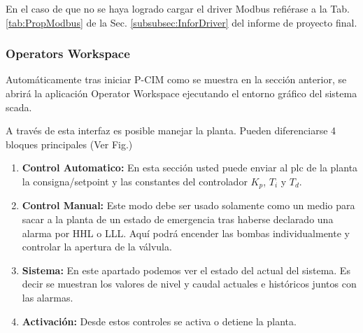 \begin{lattention}
En el caso de que no se haya logrado cargar el driver Modbus refiérase a la 
Tab. \ref{tab:PropModbus} de la Sec. \ref{subsubsec:InforDriver} del informe
de proyecto final.
\end{lattention}

\subsubsection{Operators Workspace}

Automáticamente tras iniciar P-CIM como se muestra en la sección anterior, se 
abrirá la aplicación Operator Workspace ejecutando el entorno gráfico del 
sistema \gls{scada}.

A través de esta interfaz es posible manejar la planta.
Pueden diferenciarse 4 bloques principales (Ver Fig.)
\begin{enumerate}
 \item \textbf{Control Automatico:} En esta sección usted puede enviar al
\gls{plc} de la planta la consigna/setpoint y las constantes del controlador
$K_p$, $T_i$ y $T_d$.
 \item \textbf{Control Manual:} Este modo debe ser usado solamente como un
medio para
sacar a la planta de un estado de emergencia tras  haberse declarado una alarma
por HHL o LLL.
Aquí podrá encender las bombas individualmente y controlar la apertura de la
válvula.
 \item \textbf{Sistema:} En este apartado podemos ver el estado del actual del
sistema.
Es decir se muestran los valores de nivel y caudal actuales e históricos juntos
con las alarmas.
 \item \textbf{Activación:} Desde estos controles se activa o detiene la
planta.
\end{enumerate}
